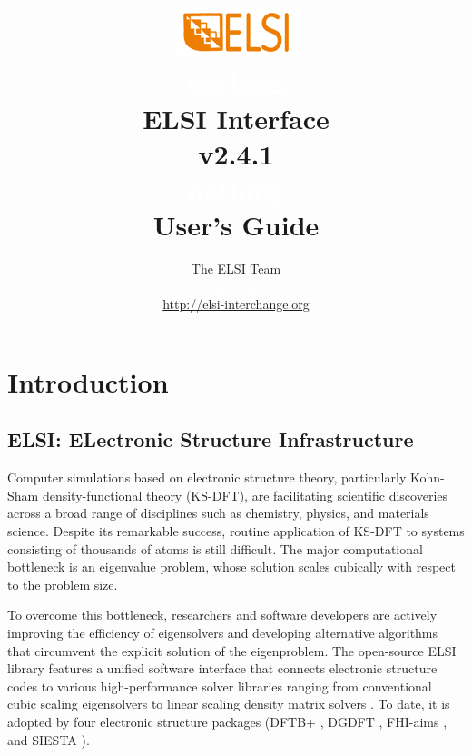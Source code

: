\documentclass{report}
\begin{document}
\title{\includegraphics[scale=0.07]{elsi_logo.png}\\ \textcolor{white}{nothing}\\ \textbf{ELSI Interface\\ v2.4.1\\ \textcolor{white}{nothing} \\ User's Guide}}
\author{The ELSI Team\\ \textcolor{white}{nothing}\\ \url{http://elsi-interchange.org}}
\maketitle

\tableofcontents

\chapter{Introduction}
\section{ELSI: ELectronic Structure Infrastructure}
\label{sec:elsi}
Computer simulations based on electronic structure theory, particularly Kohn-Sham density-functional theory (KS-DFT), are facilitating scientific discoveries across a broad range of disciplines such as chemistry, physics, and materials science. Despite its remarkable success, routine application of KS-DFT to systems consisting of thousands of atoms is still difficult. The major computational bottleneck is an eigenvalue problem, whose solution scales cubically with respect to the problem size.

To overcome this bottleneck, researchers and software developers are actively improving the efficiency of eigensolvers and developing alternative algorithms that circumvent the explicit solution of the eigenproblem. The open-source ELSI library features a unified software interface that connects electronic structure codes to various high-performance solver libraries ranging from conventional cubic scaling eigensolvers to linear scaling density matrix solvers \cite{elsi_yu_2018}. To date, it is adopted by four electronic structure packages (DFTB+ \cite{dftb_aradi_2007}, DGDFT \cite{dgdft_hu_2015}, FHI-aims \cite{fhiaims_blum_2009}, and SIESTA \cite{siesta_soler_2002}).
\end{document}
